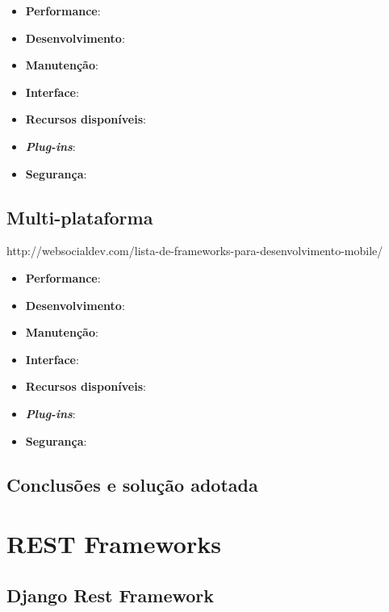 \begin{itemize}
	\item \textbf{Performance}: 
	\item \textbf{Desenvolvimento}: 
	\item \textbf{Manutenção}: 
	\item \textbf{Interface}: 
	\item \textbf{Recursos disponíveis}: 
	\item \textbf{\textit{Plug-ins}}: 
	\item \textbf{Segurança}: 
\end{itemize}



\subsection{Multi-plataforma}

http://websocialdev.com/lista-de-frameworks-para-desenvolvimento-mobile/


\begin{itemize}
	\item \textbf{Performance}: 
	\item \textbf{Desenvolvimento}: 
	\item \textbf{Manutenção}: 
	\item \textbf{Interface}: 
	\item \textbf{Recursos disponíveis}: 
	\item \textbf{\textit{Plug-ins}}: 
	\item \textbf{Segurança}: 
\end{itemize}




\subsection{Conclusões e solução adotada}





\newpage
\section{REST Frameworks}




\subsection{Django Rest Framework}





